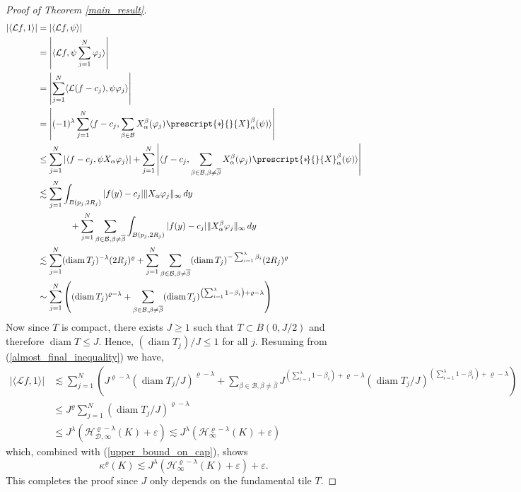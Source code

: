 \documentclass[12pt,a4paper,reqno]{amsart}
\renewcommand{\L}{\mathcal{L}}
\renewcommand{\k}{\kappa}
\renewcommand{\l}{\lambda}
\renewcommand{\a}{\alpha}
\newcommand{\diam}{\operatorname{diam}}
\newcommand{\h}{\mathcal{H}_{\infty}}
\numberwithin{equation}{section}
\theoremstyle{definition}
\renewcommand*{\star}[2][-3mu]{\ensuremath{\mskip1mu\prescript{\smash{\mathrm *\mkern#1}}{}{\mathstrut#2}}}
\begin{document}
\begin{proof}[Proof of Theorem \ref{main_result}]
\begin{align}
    | \langle \L f, 1 \rangle | &= |\langle \L f, \psi \rangle | \nonumber \\ &= \left| \langle \L f, \psi \sum_{j=1}^N \varphi_j \rangle \right| \nonumber \\ &= \left| \sum_{j=1}^N \langle \L (f-c_j) , \psi \varphi_j \rangle \right| \nonumber \\ &= \left| (-1)^{\l} \sum_{j=1}^N \langle f - c_j , \sum_{\beta \in \mathcal{B}} X_{\a}^{\beta}(\varphi_j) \star{X}_{\a}^{\beta}(\psi) \rangle \right| \nonumber \\ &\leq \sum_{j=1}^N |\langle f -c_j ,\psi X_{\a} \varphi_j \rangle| + \sum_{j=1}^N \left| \langle f -c_j , \sum_{\beta \in \mathcal{B}, \beta \neq \overline{\beta}} X_{\a}^{\beta}(\varphi_j)\star{X}_{\a}^{\beta}(\psi) \rangle \right| \nonumber \\ &\lesssim \sum_{j=1}^N \int_{B(p_j , 2R_j)} |f(y) - c_j| \| X_{\a} \varphi_j\|_{\infty}\,dy \nonumber \\ &\,\,\,\,\,\,\,\,\,\,\,\,\,\,\,\,\,\,\,\,\,\, + \sum_{j=1}^N \sum_{\beta \in \mathcal{B}, \beta\neq \overline{\beta}} \int_{B(p_j , 2R_j)} |f(y) - c_j| \| X_{\a}^{\beta} \varphi_j\|_{\infty}\,dy \nonumber \\ &\lesssim \sum_{j=1}^N (\diam T_j)^{-\l} (2R_j)^{\varrho} + \sum_{j=1}^N \sum_{\beta \in \mathcal{B} , \beta \neq \overline{\beta}} (\diam T_j)^{-\sum_{i=1}^{\l} \beta_i}(2R_j)^{\varrho} \nonumber \\ &\sim \sum_{j=1}^N\left( (\diam T_j)^{\varrho - \l} + \sum_{\beta \in \mathcal{B}, \beta \neq \overline{\beta}} (\diam T_j)^{\left(\sum_{i=1}^{\l} 1-\beta_i \right) + \varrho -\l}\right) \label{almost_final_inequality}
\end{align}
Now since $T$ is compact, there exists $J \geq 1$ such that $T \subset B(0, J/2)$ and therefore $\diam T \leq J$. Hence, $(\diam T_j) / J \leq 1$ for all $j$. Resuming from (\ref{almost_final_inequality}) we have, \begin{align*}
    |\langle \L f, 1 \rangle| &\lesssim \sum_{j=1}^N \left( J^{\varrho - \l} (\diam T_j / J)^{\varrho - \l} + \sum_{\beta \in \mathcal{B} , \beta \neq \overline{\beta}} J^{\left(\sum_{i=1}^{\l} 1-\beta_i \right) + \varrho -\l} (\diam T_j / J)^{\left(\sum_{i=1}^{\l} 1-\beta_i \right) + \varrho -\l} \right) \\ &\leq J^{\varrho} \sum_{j=1}^N \left( \diam T_j / J\right)^{\varrho - \l}  \\ &\leq J^{\l} (\mathcal{H}_{\mathcal{D},\infty}^{\varrho-\l}(K) + \varepsilon) \lesssim J^{\l}(\h^{\varrho-\l}(K) +\varepsilon)
\end{align*}
which, combined with (\ref{upper_bound_on_cap}), shows $$\k^{\varrho}(K) \lesssim J^{\l}(\h^{\varrho-\l}(K) +\varepsilon) + \varepsilon.$$ This completes the proof since $J$ only depends on the fundamental tile $T$.   
\end{proof}
\end{document}
